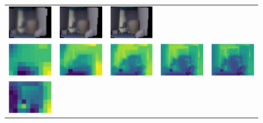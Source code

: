 \begin{figure}
\begin{center}
\begin{tabular}{c c c c c}
        \includegraphics[width=2.2cm]{main/chapter03/data/depth/image_dst_to_src_avg_3.jpg} &
        \includegraphics[width=2.2cm]{main/chapter03/data/depth/image_dst_to_src_avg_4.jpg} &
        \includegraphics[width=2.2cm]{main/chapter03/data/depth/image_dst_to_src_avg_5.jpg} \\
        \includegraphics[width=2.2cm]{main/chapter03/data/depth/depth_1.jpg} &
        \includegraphics[width=2.2cm]{main/chapter03/data/depth/depth_2.jpg} &
        \includegraphics[width=2.2cm]{main/chapter03/data/depth/depth_3.jpg} &
        \includegraphics[width=2.2cm]{main/chapter03/data/depth/depth_4.jpg} &
        \includegraphics[width=2.2cm]{main/chapter03/data/depth/depth_5.jpg} \\
        \includegraphics[width=2.2cm]{main/chapter03/data/depth/error_1.jpg} &

\end{tabular}
\end{center}
\end{figure}
